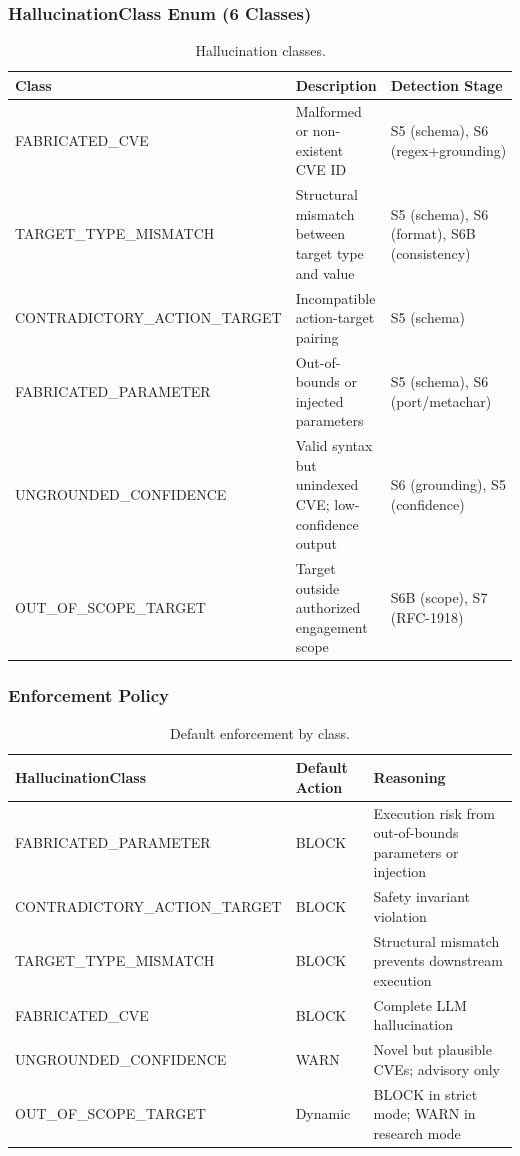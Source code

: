 \documentclass[10pt,journal,onecolumn]{IEEEtran}
\begin{document}
\subsubsection{HallucinationClass Enum (6 Classes)}
\begin{table}[t]
\caption{Hallucination classes.}
\label{tab:hallucination}
\begin{tabularx}{\textwidth}{>{\ttfamily}l X X}
\toprule
\textbf{Class} & \textbf{Description} & \textbf{Detection Stage}\\
\midrule
FABRICATED\_CVE & Malformed or non-existent CVE ID & S5 (schema), S6 (regex+grounding)\\
TARGET\_TYPE\_MISMATCH & Structural mismatch between target type and value & S5 (schema), S6 (format), S6B (consistency)\\
CONTRADICTORY\_ACTION\_TARGET & Incompatible action-target pairing & S5 (schema)\\
FABRICATED\_PARAMETER & Out-of-bounds or injected parameters & S5 (schema), S6 (port/metachar)\\
UNGROUNDED\_CONFIDENCE & Valid syntax but unindexed CVE; low-confidence output & S6 (grounding), S5 (confidence)\\
OUT\_OF\_SCOPE\_TARGET & Target outside authorized engagement scope & S6B (scope), S7 (RFC-1918)\\
\bottomrule
\end{tabularx}
\end{table}

\subsubsection{Enforcement Policy}
\begin{table}[h]
\caption{Default enforcement by class.}
\label{tab:enforcement}
\begin{tabularx}{\columnwidth}{>{\ttfamily}l l X}
\toprule
\textbf{HallucinationClass} & \textbf{Default Action} & \textbf{Reasoning}\\
\midrule
FABRICATED\_PARAMETER & BLOCK & Execution risk from out-of-bounds parameters or injection\\
CONTRADICTORY\_ACTION\_TARGET & BLOCK & Safety invariant violation\\
TARGET\_TYPE\_MISMATCH & BLOCK & Structural mismatch prevents downstream execution\\
FABRICATED\_CVE & BLOCK & Complete LLM hallucination\\
UNGROUNDED\_CONFIDENCE & WARN & Novel but plausible CVEs; advisory only\\
OUT\_OF\_SCOPE\_TARGET & Dynamic & BLOCK in strict mode; WARN in research mode\\
\bottomrule
\end{tabularx}
\end{table}
\end{document}
